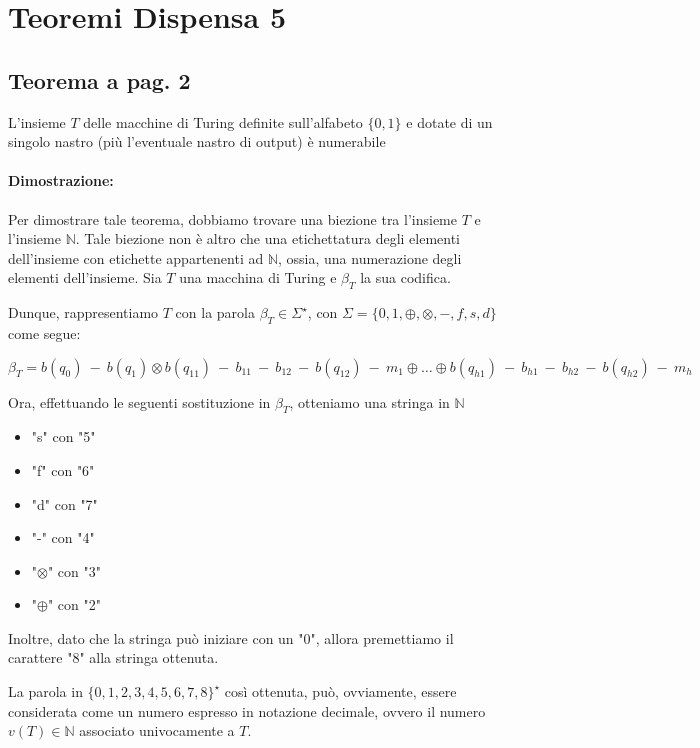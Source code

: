 \section{Teoremi Dispensa 5}

\subsection{Teorema a pag. 2}

L'insieme $T$ delle macchine di Turing definite sull'alfabeto $\{0, 1\}$ e dotate di un singolo nastro
(più l'eventuale nastro di output) è numerabile

\paragraph*{Dimostrazione:}
Per dimostrare tale teorema, dobbiamo trovare una biezione tra l'insieme $T$ e l'insieme $\mathbb{N}$. Tale 
biezione non è altro che una etichettatura degli elementi dell'insieme con etichette appartenenti ad $\mathbb{N}$, ossia,
una numerazione degli elementi dell'insieme. Sia $T$ una macchina di Turing e $\beta_{T}$ la sua codifica.

Dunque, rappresentiamo $T$ con la parola $\beta_{T}\in \Sigma^{\star}$, con $\Sigma=\{0, 1, \oplus, \otimes, -, f, s, d\}$ come segue:

$$
\beta_{T} = b(q_{0})\ -\ b(q_{1})\otimes b(q_{11})\ -\ b_{11}\ -\ b_{12}\ -\ b(q_{12})\ -\ m_{1}\oplus \dots \oplus b(q_{h1})\ -\ b_{h1}\ -\ b_{h2}\ -\ b(q_{h2})\ -\ m_{h}
$$

Ora, effettuando le seguenti sostituzione in $\beta_{T}$, otteniamo una stringa in $\mathbb{N}$ 

\begin{itemize}
    \item "s" con "5"
    \item "f" con "6"
    \item "d" con "7"
    \item "-" con "4"
    \item "$\otimes$" con "3"
    \item "$\oplus$" con "2"
\end{itemize}

Inoltre, dato che la stringa può iniziare con un "0", allora premettiamo il carattere "8" alla stringa ottenuta.

La parola in $\{0, 1, 2, 3, 4, 5, 6, 7, 8\}^{\star}$ così ottenuta, può, ovviamente, essere considerata come un numero 
espresso in notazione decimale, ovvero il numero $v(T)\in \mathbb{N}$ associato univocamente a $T$.

